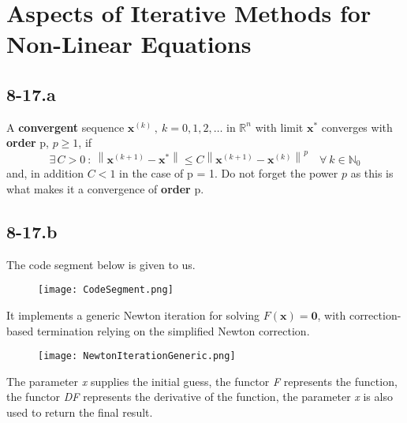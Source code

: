 \documentclass{article}
\newcommand\xk{\mathbf{x}^{\left(k\right)}}
\newcommand\xnNorm{\left\lVert\mathbf{x}^{\left(k + 1\right)} - \mathbf{x}^{\left(k\right)} \right\rVert}
\newcommand\xsNorm{\left\lVert\mathbf{x}^{\left(k + 1\right)} - \mathbf{x}^{*} \right\rVert}
\begin{document}
\section*{Aspects of Iterative Methods for Non-Linear Equations}
\subsection*{8-17.a}
A \textbf{convergent} sequence $\xk\, , \: k = 0,1,2, \dots$ in $\mathbb{R}^{n}$ with limit $\mathbf{x}^{*}$ converges with \textbf{order} p, $p \geq 1$, if
\begin{equation*}
    \exists\,C >0 \: : \: \xsNorm \leq C \xnNorm^{p} \quad \forall \: k \in \mathbb{N}_{0}
\end{equation*}
and, in addition $C < 1$ in the case of p = 1. Do not forget the power $p$ as this is what makes it a convergence of \textbf{order} p.
\subsection*{8-17.b}
The code segment below is given to us.
\begin{figure}[!hbt]
    \centering
\texttt{[image: CodeSegment.png]}
\end{figure}
It implements a generic Newton iteration for solving $F\left(\mathbf{x}\right) = \mathbf{0}$, with correction-based termination relying on the simplified Newton correction.
\begin{figure}[!hbt]
    \centering
\texttt{[image: NewtonIterationGeneric.png]}
\end{figure}
The parameter \textit{x} supplies the initial guess, the functor \textit{F} represents the function, the functor \textit{DF} represents the derivative of the function, the parameter \textit{x} is also used to return the final result. 

\pagebreak
\end{document}
